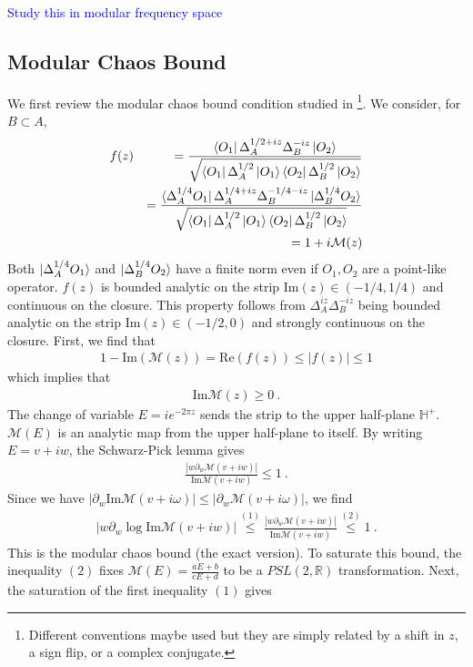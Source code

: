 \documentclass[a4paper,11pt]{article}
\theoremstyle{definition}
\newcommand{\nn}{\nonumber}
\newcommand{\mM}{\mathcal{M}}
\newcommand{\NL}[1]{\textcolor{blue}{#1}}
\newcommand{\p}{\partial}
\begin{document}
\NL{Study this in modular frequency space}

\subsection{Modular Chaos Bound}
We first review the modular chaos bound condition studied in \cite{}\footnote{Different conventions maybe used but they are simply related by a shift in $z$, a sign flip, or a complex conjugate.}. We consider, for $B \subset A$,
\begin{eqnarray}
    f(z)&&=\frac{\bra{O_1}\Delta_A^{1/2+iz}\Delta_B^{-iz}\ket{O_2}}{\sqrt{\bra{O_1}\Delta_A^{1/2}\ket{O_1} \bra{O_2}\Delta_B^{1/2}\ket{O_2}}}\\
    &&=\frac{\bra{\Delta_A^{1/4}O_1} \Delta_A^{1/4+iz}\Delta_B^{-1/4-iz}\ket{\Delta_B^{1/4} O_2}}{\sqrt{\bra{O_1}\Delta_A^{1/2}\ket{O_1} \bra{O_2}\Delta_B^{1/2}\ket{O_2}}}\nn\\
    &&=1+i \mathcal{M}(z)
\end{eqnarray}
Both $\ket{\Delta_A^{1/4}O_1}$ and $\ket{\Delta_B^{1/4} O_2}$ have a finite norm even if $O_1, O_2$ are a point-like operator. $f(z)$ is bounded analytic on the strip Im$(z) \in (-1/4,1/4)$ and continuous on the closure. This property follows from $\Delta_A^{iz}\Delta_B^{-iz}$ being bounded analytic on the strip Im$(z) \in (-1/2,0)$ and strongly continuous on the closure. 
First, we find that 
\begin{eqnarray}
    1-\text{Im}(\mathcal{M}(z))=\text{Re}(f(z))\leq |f(z)|\leq 1
\end{eqnarray}
which implies that 
\begin{eqnarray}
    \text{Im}\mathcal{M}(z)\geq 0\ .
\end{eqnarray}
The change of variable $E=ie^{-2\pi z}$ sends the strip to the upper half-plane $\mathbb{H}^+$. $\mM(E)$ is an analytic map from the upper half-plane to itself. By writing $E=v+iw$, the Schwarz-Pick lemma gives
\begin{eqnarray}
    \frac{|w \p_w \mM(v+iw)|}{\text{Im} \mM(v+iw)}\leq 1\ . 
\end{eqnarray}
Since we have $|\p_w \text{Im}\mM(v+i\omega)|\leq |\p_w \mM(v+i\omega)|$, we find
\begin{eqnarray}
    |w\p_w \log \text{Im} \mM(v+iw)| \stackrel{(1)}{\leq} \frac{|w \p_w \mM(v+iw)|}{\text{Im} \mM(v+iw)} \stackrel{(2)}{\leq} 1\ .
\end{eqnarray}
This is the modular chaos bound (the exact version). To saturate this bound, the inequality $(2)$ fixes $\mM(E)=\frac{a E+b}{c E+d}$ to be a $PSL(2,\mathbb{R})$ transformation. Next, the saturation of the first inequality $(1)$ gives
\end{document}
